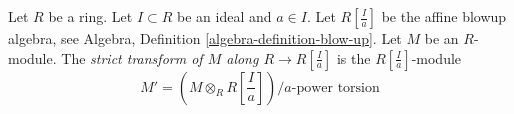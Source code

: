 \begin{definition}
\label{definition-strict-transform}
Let $R$ be a ring. Let $I \subset R$ be an ideal and $a \in I$.
Let $R[\frac{I}{a}]$ be the affine blowup algebra, see
Algebra, Definition \ref{algebra-definition-blow-up}.
Let $M$ be an $R$-module.
The {\it strict transform of $M$ along $R \to R[\frac{I}{a}]$} is
the $R[\frac{I}{a}]$-module
$$
M' = \left(M \otimes_R R[\textstyle{\frac{I}{a}}]\right)/a\text{-power torsion}
$$
\end{definition}